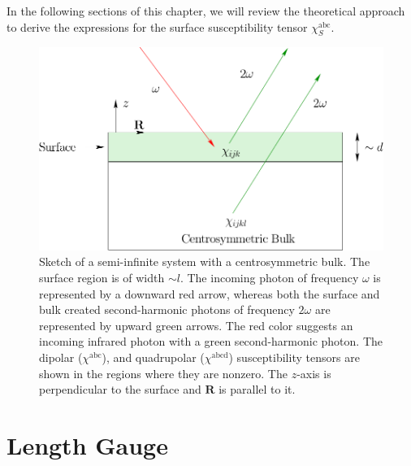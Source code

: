 In the following sections of this chapter, we will review the theoretical
approach to derive the expressions for the surface susceptibility tensor
$\chi^{\mathrm{abc}}_{S}$.

\begin{figure}[t]
\centering
\includegraphics[scale=0.6]{content/figures/diag-system}
\caption{Sketch of a semi-infinite system with a centrosymmetric bulk. The
surface region is of width $\sim l$. The incoming photon of frequency $\omega$
is represented by a downward red arrow, whereas both the surface and bulk
created second-harmonic photons of frequency $2\omega$ are represented by upward
green arrows. The red color suggests an incoming infrared photon with a green
second-harmonic photon. The dipolar ($\chi^{\mathrm{abc}}$), and quadrupolar
($\chi^{\mathrm{abcd}}$) susceptibility tensors are shown in the regions where
they are nonzero. The $z$-axis is perpendicular to the surface and $\mathbf{R}$
is parallel to it.}
\label{fsystem}
\end{figure}



\section{Length Gauge}\label{longi}

